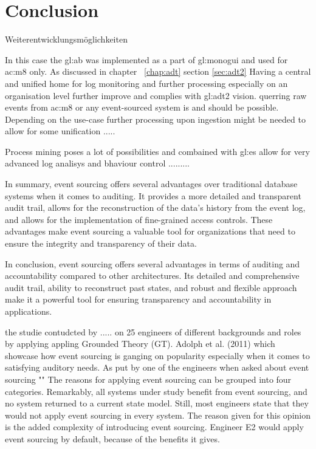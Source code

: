 %
\chapter{Conclusion}

Weiterentwicklungsmöglichkeiten

In this case the \gls{gl:ab} was implemented as a part of \gls{gl:monogui} and used for \gls{ac:m8} only. As discussed in chapter ~\ref{chap:adt} section \ref{sec:adt2} Having a central and unified home for log monitoring and further processing especially on an organisation level further improve and complies with \gls{gl:adt2} vision. querring raw events from \gls{ac:m8} or any event-sourced system is and should be possible. Depending on the use-case further processing upon ingestion might be needed to allow for some unification .....


Process mining poses a lot of possibilities and combained with \gls{gl:es} allow for very advanced log analisys and bhaviour control .........

In summary, event sourcing offers several advantages over traditional database systems when it comes to auditing. It provides a more detailed and transparent audit trail, allows for the reconstruction of the data's history from the event log, and allows for the implementation of fine-grained access controls. These advantages make event sourcing a valuable tool for organizations that need to ensure the integrity and transparency of their data.

In conclusion, event sourcing offers several advantages in terms of auditing and accountability compared to other architectures. Its detailed and comprehensive audit trail, ability to reconstruct past states, and robust and flexible approach make it a powerful tool for ensuring transparency and accountability in applications.

the studie contudcted by ..... on 25 engineers of different backgrounds and roles by applying appling Grounded Theory (GT). Adolph et al. (2011) which showcase how event sourcing is ganging on popularity especially when it comes to satisfying auditory needs. As put by one of the engineers when asked about event sourcing ""
The reasons for applying event sourcing can be grouped into four categories. Remarkably, all systems under study benefit from event sourcing, and no system returned to a current state model. Still, most engineers state that they would not apply event sourcing in every system. The reason given for this opinion is the added complexity of introducing event sourcing. Engineer E2 would apply event sourcing by default, because of the benefits it gives.~\citep{OVEREEM2021110970}